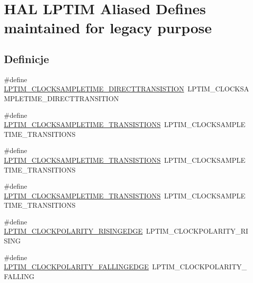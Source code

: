 \hypertarget{group___h_a_l___l_p_t_i_m___aliased___defines}{}\section{H\+AL L\+P\+T\+IM Aliased Defines maintained for legacy purpose}
\label{group___h_a_l___l_p_t_i_m___aliased___defines}
\subsection*{Definicje}
\begin{DoxyCompactItemize}
\item 
\#define \hyperlink{group___h_a_l___l_p_t_i_m___aliased___defines_gafdb10b009398575734c5178aac14b142}{L\+P\+T\+I\+M\+\_\+\+C\+L\+O\+C\+K\+S\+A\+M\+P\+L\+E\+T\+I\+M\+E\+\_\+\+D\+I\+R\+E\+C\+T\+T\+R\+A\+N\+S\+I\+S\+T\+I\+ON}~L\+P\+T\+I\+M\+\_\+\+C\+L\+O\+C\+K\+S\+A\+M\+P\+L\+E\+T\+I\+M\+E\+\_\+\+D\+I\+R\+E\+C\+T\+T\+R\+A\+N\+S\+I\+T\+I\+ON
\item 
\#define \hyperlink{group___h_a_l___l_p_t_i_m___aliased___defines_ga49d2594a7e995275422b120c52af4208}{L\+P\+T\+I\+M\+\_\+\+C\+L\+O\+C\+K\+S\+A\+M\+P\+L\+E\+T\+I\+M\+E\+\_\+T\+R\+A\+N\+S\+I\+S\+T\+I\+O\+NS}~L\+P\+T\+I\+M\+\_\+\+C\+L\+O\+C\+K\+S\+A\+M\+P\+L\+E\+T\+I\+M\+E\+\_\+T\+R\+A\+N\+S\+I\+T\+I\+O\+NS
\item 
\#define \hyperlink{group___h_a_l___l_p_t_i_m___aliased___defines_ga9307914c57875ea6ee6d02653b1f301b}{L\+P\+T\+I\+M\+\_\+\+C\+L\+O\+C\+K\+S\+A\+M\+P\+L\+E\+T\+I\+M\+E\+\_\+T\+R\+A\+N\+S\+I\+S\+T\+I\+O\+NS}~L\+P\+T\+I\+M\+\_\+\+C\+L\+O\+C\+K\+S\+A\+M\+P\+L\+E\+T\+I\+M\+E\+\_\+T\+R\+A\+N\+S\+I\+T\+I\+O\+NS
\item 
\#define \hyperlink{group___h_a_l___l_p_t_i_m___aliased___defines_ga3d2f9912092f5a206324a7111cf4074f}{L\+P\+T\+I\+M\+\_\+\+C\+L\+O\+C\+K\+S\+A\+M\+P\+L\+E\+T\+I\+M\+E\+\_\+T\+R\+A\+N\+S\+I\+S\+T\+I\+O\+NS}~L\+P\+T\+I\+M\+\_\+\+C\+L\+O\+C\+K\+S\+A\+M\+P\+L\+E\+T\+I\+M\+E\+\_\+T\+R\+A\+N\+S\+I\+T\+I\+O\+NS
\item 
\#define \hyperlink{group___h_a_l___l_p_t_i_m___aliased___defines_gae63e785e207abad35b7927bcf17b6136}{L\+P\+T\+I\+M\+\_\+\+C\+L\+O\+C\+K\+P\+O\+L\+A\+R\+I\+T\+Y\+\_\+\+R\+I\+S\+I\+N\+G\+E\+D\+GE}~L\+P\+T\+I\+M\+\_\+\+C\+L\+O\+C\+K\+P\+O\+L\+A\+R\+I\+T\+Y\+\_\+\+R\+I\+S\+I\+NG
\item 
\#define \hyperlink{group___h_a_l___l_p_t_i_m___aliased___defines_ga135a25bdd31397065f1fc31df3527f63}{L\+P\+T\+I\+M\+\_\+\+C\+L\+O\+C\+K\+P\+O\+L\+A\+R\+I\+T\+Y\+\_\+\+F\+A\+L\+L\+I\+N\+G\+E\+D\+GE}~L\+P\+T\+I\+M\+\_\+\+C\+L\+O\+C\+K\+P\+O\+L\+A\+R\+I\+T\+Y\+\_\+\+F\+A\+L\+L\+I\+NG

\end{DoxyCompactItemize}
